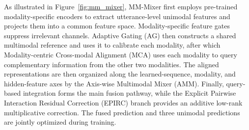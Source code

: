 \documentclass[letterpaper]{article} %
\begin{document}
As illustrated in Figure~\ref{fig:mm_mixer}, MM-Mixer first employs pre-trained modality-specific encoders to extract utterance-level unimodal features and projects them
into a common feature space. Modality-specific feature gates suppress
irrelevant channels. Adaptive Gating (AG) then constructs a shared
multimodal reference and uses it to calibrate each modality, after which
Modality-centric Cross-modal Alignment (MCA) uses each modality to query
complementary information from the other two modalities. The aligned
representations are then organized along the learned-sequence, modality,
and hidden-feature axes by the Axis-wise Multimodal Mixer (AMM).
Finally, query-based integration forms the main fusion pathway, while
the Explicit Pairwise Interaction Residual Correction (EPIRC) branch provides an
additive low-rank multiplicative correction. The fused prediction and
three unimodal predictions are jointly optimized during training.


\end{document}
